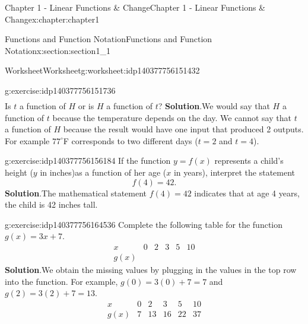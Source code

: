 \documentclass[oneside,10pt,]{book}
\newcommand{\blocktitlefont}{\relax}
\begin{document}
\begin{chapterptx}{Chapter 1 - Linear Functions \& Change}{}{Chapter 1 - Linear Functions \& Change}{}{}{x:chapter:chapter1}
\begin{sectionptx}{Functions and Function Notation}{}{Functions and Function Notation}{}{}{x:section:section1_1}
\begin{worksheet-subsection}{Worksheet}{}{Worksheet}{}{}{g:worksheet:idp140377756151432}
\begin{divisionexercise}{1}{}{}{g:exercise:idp140377756151736}
\begin{equation*}
\begin{array}{l|c|c|c|c|c|c|c}
\end{array}
\end{equation*}
Is \(t\) a function of \(H\) or is \(H\) a function of \(t\)?%
\textbf{\blocktitlefont Solution}.\hypertarget{g:solution:idp140377756152280}{}\quad{}We would say that \(H\) a function of \(t\) because the temperature depends on the day. We cannot say that \(t\) a function of \(H\) because the result would have one input that produced 2 outputs. For example \(77^{\circ}\)F corresponds to two different days (\(t=2\) and \(t=4\)).\end{divisionexercise}%
\begin{divisionexercise}{2}{}{}{g:exercise:idp140377756156184}%
If the function \(y=f(x)\) represents a child's height (\(y\) in inches)as a function of her age (\(x\) in years), interpret the statement%
\begin{equation*}
f(4)=42. 
\end{equation*}
%
\textbf{\blocktitlefont Solution}.\hypertarget{g:solution:idp140377756164408}{}\quad{}The mathematical statement \(f(4)=42\) indicates that at age 4 years, the child is 42 inches tall.\end{divisionexercise}%
\begin{divisionexercise}{3}{}{}{g:exercise:idp140377756164536}%
Complete the following table for the function \(g(x)=3x+7\).%
\begin{equation*}
\begin{array}{l|c|c|c|c|c}
x & 0 & 2 & 3 & 5 & 10 \\
\hline g(x) &  &  &  & &
\end{array}
\end{equation*}
%
\textbf{\blocktitlefont Solution}.\hypertarget{g:solution:idp140377756167800}{}\quad{}We obtain the missing values by plugging in the values in the top row into the function. For example, \(g(0)=3(0)+7=7\) and \(g(2)=3(2)+7=13\).%
\begin{equation*}
\begin{array}{l|c|c|c|c|c}
x & 0 & 2 & 3 & 5 & 10 \\
\hline g(x) & 7 & 13 & 16 & 22 & 37
\end{array}
\end{equation*}
\end{divisionexercise}%
\end{worksheet-subsection}
\restoregeometry
\end{sectionptx}
%
%
\typeout{************************************************}
\typeout{************************************************}

\end{chapterptx}
\end{document}
